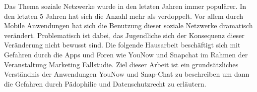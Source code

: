 Das Thema soziale Netzwerke wurde in den letzten Jahren immer populärer. In den letzten 5 Jahren hat sich die Anzahl mehr als verdoppelt. Vor allem durch Mobile Anwendungen hat sich die Benutzung dieser soziale Netzwerke dramatisch verändert. Problematisch ist dabei, das Jugendliche sich der Konsequenz dieser Veränderung nicht bewusst sind.
Die folgende Hausarbeit beschäftigt sich mit Gefahren durch die Apps und Foren wie YouNow und Snapchat im Rahmen der Veranstaltung Marketing Fallstudie. Ziel dieser Arbeit ist ein grundsätzliches Verständnis der Anwendungen YouNow und Snap-Chat zu beschreiben um dann die Gefahren durch Pädophilie und Datenschutzrecht zu erläutern.
 